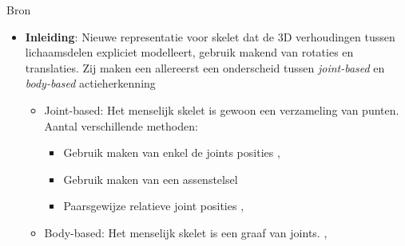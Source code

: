Bron \cite{Vemulapalli2014}
\begin{itemize}
	\item \textbf{Inleiding}: Nieuwe representatie voor skelet dat de 3D verhoudingen tussen lichaamsdelen expliciet modelleert, gebruik makend van rotaties en translaties. Zij maken een allereerst een onderscheid tussen \textit{joint-based} en \textit{body-based} actieherkenning
	\begin{itemize}
		\item Joint-based: Het menselijk skelet is gewoon een verzameling van punten. Aantal verschillende methoden:
		\begin{itemize}
			\item Gebruik maken van enkel de joints posities \cite{Hussein2013}, \cite{Lv2006}
			\item Gebruik maken van een assenstelsel \cite{Xia2012}
			\item Paarsgewijze relatieve joint posities \cite{Wang2012b}, \cite{Yang2012}
		\end{itemize}
		
		\item Body-based: Het menselijk skelet is een graaf van joints. \cite{Ofli2012}, \cite{Chaudhry2013}
	\end{itemize}
	

\end{itemize}
